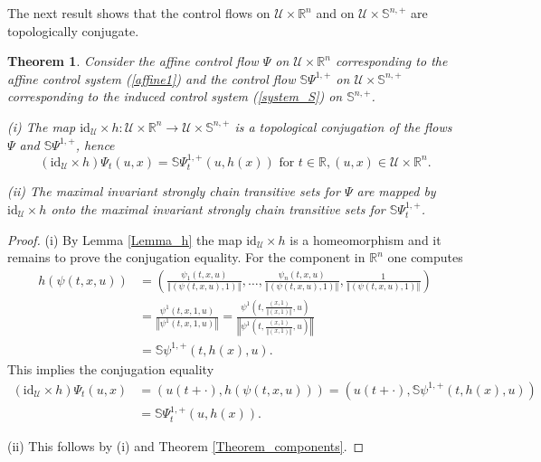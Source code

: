 \documentclass[preprint,12pt]{elsarticle}
\newtheorem{theorem}{Theorem}
\begin{document}
The next result shows that the control flows on $\mathcal{U}\times
\mathbb{R}^{n}$ and on $\mathcal{U}\times\mathbb{S}^{n,+}$ are topologically conjugate.

\begin{theorem}
\label{Theorem_conjugate}Consider the affine control flow $\Psi$ on
$\mathcal{U}\times\mathbb{R}^{n}$ corresponding to the affine control system
(\ref{affine1}) and the control flow $\mathbb{S}\Psi^{1,+}$ on $\mathcal{U}%
\times\mathbb{S}^{n,+}$ corresponding to the induced control system
(\ref{system_S}) on $\mathbb{S}^{n,+}$.

(i) The map $\mathrm{id}_{\mathcal{U}}\times h:\mathcal{U}\times\mathbb{R}%
^{n}\rightarrow\mathcal{U}\times\mathbb{S}^{n,+}$ is a topological conjugation
of the flows $\Psi$ and $\mathbb{S}\Psi^{1,+}$, hence%
\[
\left(  \mathrm{id}_{\mathcal{U}}\times h\right)  \Psi_{t}(u,x)=\mathbb{S}%
\Psi_{t}^{1,+}(u,h(x))\text{ for }t\in\mathbb{R},(u,x)\in\mathcal{U}%
\times\mathbb{R}^{n}.
\]


(ii) The maximal invariant strongly chain transitive sets for $\Psi$ are
mapped by $\mathrm{id}_{\mathcal{U}}\times h$ onto the maximal invariant
strongly chain transitive sets for $\mathbb{S}\Psi_{t}^{1,+}$.
\end{theorem}

\begin{proof}
(i) By Lemma \ref{Lemma_h} the map $\mathrm{id}_{\mathcal{U}}\times h$ is a
homeomorphism and it remains to prove the conjugation equality. For the
component in $\mathbb{R}^{n}$ one computes%
\begin{align*}
h(\psi(t,x,u))  &  =\left(  \frac{\psi_{1}(t,x,u)}{\left\Vert (\psi
(t,x,u),1)\right\Vert },\ldots,\frac{\psi_{n}(t,x,u)}{\left\Vert
(\psi(t,x,u),1)\right\Vert },\frac{1}{\left\Vert (\psi(t,x,u),1)\right\Vert
}\right) \\
&  =\frac{\psi^{1}(t,x,1,u)}{\left\Vert \psi^{1}(t,x,1,u)\right\Vert }%
=\frac{\psi^{1}\left(  t,\frac{\left(  x,1\right)  }{\left\Vert
(x,1)\right\Vert },u\right)  }{\left\Vert \psi^{1}\left(  t,\frac{\left(
x,1\right)  }{\left\Vert (x,1)\right\Vert },u\right)  \right\Vert }\\
&  =\mathbb{S}\psi^{1,+}(t,h(x),u).
\end{align*}
This implies the conjugation equality%
\begin{align*}
(\mathrm{id}_{\mathcal{U}}\times h)\Psi_{t}(u,x)  &  =\left(  u(t+\cdot
),h(\psi(t,x,u))\right)  =\left(  u(t+\cdot),\mathbb{S}\psi^{1,+}%
(t,h(x),u)\right) \\
&  =\mathbb{S}\Psi_{t}^{1,+}(u,h(x)).
\end{align*}


(ii) This follows by (i) and Theorem \ref{Theorem_components}.
\end{proof}
\end{document}
